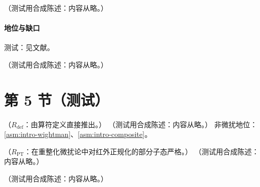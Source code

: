 \begin{proposition}\label{prop:coll-ww}
（测试用合成陈述：内容从略。）
\end{proposition}
\paragraph{地位与缺口}测试：见文献。

\begin{definition}[横度分布]\label{def:coll-transversity}
（测试用合成陈述：内容从略。）
\end{definition}

\section{第 5 节（测试）}\label{sec:coll-transversity}

\begin{proposition}\label{prop:coll-transversity-evolution}
（$R_{\mathrm{def}}$：由算符定义直接推出。）
（测试用合成陈述：内容从略。）
非微扰地位：\cref{asm:intro-wightman}、\cref{asm:intro-composite}。
\end{proposition}

\begin{proposition}\label{prop:coll-soffer}
（$R_{\mathrm{PT}}$：在重整化微扰论中对红外正规化的部分子态严格。）
（测试用合成陈述：内容从略。）
\end{proposition}

\begin{remark}\label{rem:coll-christ-lee}
（测试用合成陈述：内容从略。）
\end{remark}
